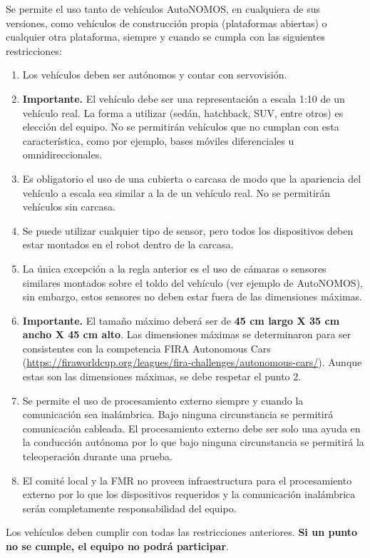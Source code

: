 \documentclass[letterpaper,12pt]{article}
\begin{document}
Se permite el uso tanto de vehículos AutoNOMOS, en cualquiera de sus versiones, como vehículos de construcción propia (plataformas abiertas) o cualquier otra plataforma, siempre y cuando se cumpla con las siguientes restricciones:
\begin{enumerate}
\item Los vehículos deben ser autónomos y contar con servovisión.
\item \textbf{Importante. } El vehículo debe ser una representación a escala 1:10 de un vehículo real. La forma a utilizar (sedán, hatchback, SUV, entre otros) es elección del equipo. No se permitirán vehículos que no cumplan con esta característica, como por ejemplo, bases móviles diferenciales u omnidireccionales.
\item Es obligatorio el uso de una cubierta o carcasa de modo que la apariencia del vehículo a escala sea similar a la de un vehículo real. No se permitirán vehículos sin carcasa.
\item Se puede utilizar cualquier tipo de sensor, pero todos los dispositivos deben estar montados en el robot dentro de la carcasa.
\item La única excepción a la regla anterior es el uso de cámaras o sensores similares montados sobre el toldo del vehículo (ver ejemplo de AutoNOMOS), sin embargo, estos sensores no deben estar fuera de las dimensiones máximas. 
\item \textbf{Importante.} El tamaño máximo deberá ser de \textbf{45 cm largo X 35 cm ancho X 45 cm alto}. Las dimensiones máximas se determinaron para ser consistentes con la competencia FIRA Autonomous Cars (\url{https://firaworldcup.org/leagues/fira-challenges/autonomous-cars/}). Aunque estas son las dimensiones máximas, se debe respetar el punto 2. 
\item Se permite el uso de procesamiento externo siempre y cuando la comunicación sea inalámbrica. Bajo ninguna circunstancia se permitirá comunicación cableada. El procesamiento externo debe ser solo una ayuda en la conducción autónoma por lo que bajo ninguna circunstancia se permitirá la teleoperación durante una prueba.
\item El comité local y la FMR no proveen infraestructura para el procesamiento externo por lo que los dispositivos requeridos y la comunicación inalámbrica serán completamente responsabilidad del equipo.
\end{enumerate}
Los vehículos deben cumplir con todas las restricciones anteriores. \textbf{Si un punto no se cumple, el equipo no podrá participar}.
\end{document}

